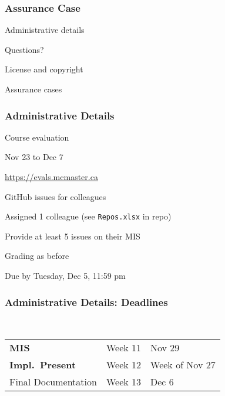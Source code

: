 \documentclass[t,12pt,numbers,fleqn]{beamer}
\begin{document}



\begin{frame}
\frametitle{Assurance Case}

\bi
\item Administrative details
\item Questions?
\item License and copyright
\item Assurance cases
\ei
\end{frame}


\begin{frame}
\frametitle{Administrative Details}

\bi
\item Course evaluation
\bi
\item Nov 23 to Dec 7
\item \url{https://evals.mcmaster.ca}
\ei
\item GitHub issues for colleagues
\bi
\item Assigned 1 colleague (see \texttt{Repos.xlsx} in repo)
\item Provide at least 5 issues on their MIS
\item Grading as before
\item Due by Tuesday, Dec 5, 11:59 pm
\ei

\ei

\end{frame}


\begin{frame}
\frametitle{Administrative Details: Deadlines}
~\newline
\begin{tabular}{l l l}
\textbf{MIS} & Week 11 & Nov 29\\
\textbf{Impl.\ Present} & Week 12 & Week of Nov 27\\
Final Documentation & Week 13 & Dec 6\\
\end {tabular}

\end{frame}

\end{document}
